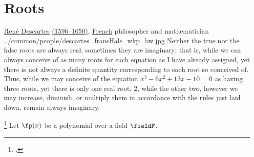 \section{Roots}
\qboxnpq
  {\href{http://en.wikipedia.org/wiki/Descartes}{Ren\'e Descartes}
   \href{http://www-history.mcs.st-andrews.ac.uk/Timelines/TimelineC.html}{(1596--1650)},
   \href{http://www-history.mcs.st-andrews.ac.uk/BirthplaceMaps/Places/France.html}{French} 
   philosopher and mathematician\footnotemark
  }
  {../common/people/descartes_fransHals_wkp_bw.jpg}
  {Neither the true nor the false roots are always real;
   sometimes they are imaginary;
   that is, while we can always conceive of as many roots for each equation
   as I have already assigned, 
   yet there is not always a definite quantity corresponding to each root so conceived of.
   Thus, while we may conceive of the equation 
   $x^3-6x^2+13x-10=0$ as having three roots,
   yet there is only one real root, 2, while the other two,
   however we may increase, diminish, or multiply them in accordance with the rules just laid down,
   remain always imaginary.}


\begin{theorem}
\footnote{
  ,
  }
Let $\fp(x)$ be a polynomial over a field $\fieldF$.
\end{theorem}

